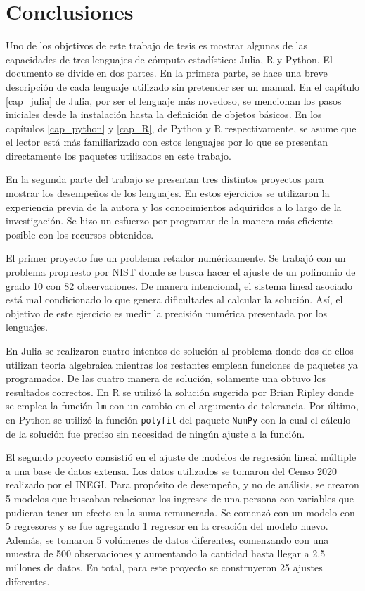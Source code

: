 \chapter{Conclusiones} \label{cap_conclusiones}
Uno de los objetivos de este trabajo de tesis es mostrar algunas de las capacidades de tres lenguajes de cómputo estadístico: \textsf{Julia}, \textsf{R} y \textsf{Python}. El documento se divide en dos partes. En la primera parte, se hace una breve descripción de cada lenguaje utilizado sin pretender ser un manual. En el capítulo \ref{cap_julia} de \textsf{Julia}, por ser el lenguaje más novedoso, se mencionan los pasos iniciales desde la instalación hasta la definición de objetos básicos. En los capítulos \ref{cap_python} y \ref{cap_R}, de \textsf{Python} y \textsf{R} respectivamente, se asume que el lector está más familiarizado con estos lenguajes por lo que se presentan directamente los paquetes utilizados en este trabajo.  

En la segunda parte del trabajo se presentan tres distintos proyectos para mostrar los desempeños de los lenguajes. En estos ejercicios se utilizaron la experiencia previa de la autora y los conocimientos adquiridos a lo largo de la investigación. Se hizo un esfuerzo por programar de la manera más eficiente posible con los recursos obtenidos.

El primer proyecto fue un problema retador numéricamente. Se trabajó con un problema propuesto por NIST donde se busca hacer el ajuste de un polinomio de grado 10 con 82 observaciones. De manera intencional, el sistema lineal asociado está mal condicionado lo que genera dificultades al calcular la solución. Así, el objetivo de este ejercicio es medir la precisión numérica presentada por los lenguajes. 

En \textsf{Julia} se realizaron cuatro intentos de solución al problema donde dos de ellos utilizan teoría algebraica mientras los restantes emplean funciones de paquetes ya programados. De las cuatro manera de solución, solamente una obtuvo los resultados correctos. En \textsf{R} se utilizó la solución sugerida por Brian Ripley donde se emplea la función \texttt{lm} con un cambio en el argumento de tolerancia. Por último, en \textsf{Python} se utilizó la función \texttt{polyfit} del paquete \texttt{NumPy} con la cual el cálculo de la solución fue preciso sin necesidad de ningún ajuste a la función. 

El segundo proyecto consistió en el ajuste de modelos de regresión lineal múltiple a una base de datos extensa. Los datos utilizados se tomaron del Censo 2020 realizado por el INEGI. Para propósito de desempeño, y no de análisis, se crearon 5 modelos que buscaban relacionar los ingresos de una persona con variables que pudieran tener un efecto en la suma remunerada. Se comenzó con un modelo con 5 regresores y se fue agregando 1 regresor en la creación del modelo nuevo. Además, se tomaron 5 volúmenes de datos diferentes, comenzando con una muestra de 500 observaciones y aumentando la cantidad hasta llegar a 2.5 millones de datos. En total, para este proyecto se construyeron 25 ajustes diferentes. 

